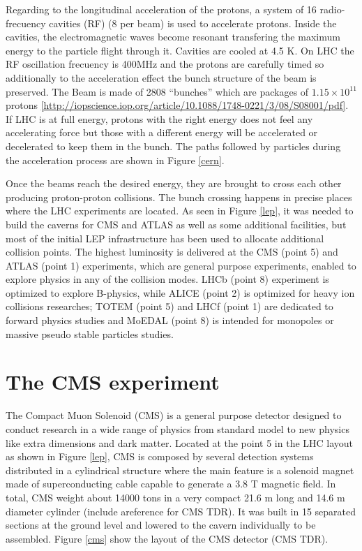 \noindent Regarding to the longitudinal acceleration of the protons, a system of 16 radio-frecuency cavities (RF) (8 per beam) is used to accelerate protons. Inside the cavities, the electromagnetic waves become resonant transfering the maximum energy to the particle flight through it. Cavities are cooled at 4.5 K. On LHC the RF oscillation frecuency is 400MHz and the protons are carefully timed so additionally to the acceleration effect the bunch structure of the beam is preserved. The Beam is made of 2808 ``bunches'' which are packages of $1.15 \times 10^11$ protons \ref{http://iopscience.iop.org/article/10.1088/1748-0221/3/08/S08001/pdf}. If LHC is at full energy, protons with the right energy does not feel any accelerating force but those with a different energy will be accelerated or decelerated to keep them in the bunch. The paths followed by particles during the acceleration process are shown in Figure \ref{cern}.




Once the beams reach the desired energy, they are brought to cross each other producing proton-proton collisions. The bunch crossing happens in precise places where the LHC experiments are located. As seen in Figure \ref{lep}, it was needed to build the caverns for CMS and ATLAS as well as some additional facilities, but most of the initial LEP infrastructure has been used to allocate additional collision points. The highest luminosity is delivered at the CMS (point 5) and ATLAS (point 1) experiments, which are general purpose experiments, enabled to explore physics in any of the collision modes. LHCb (point 8) experiment is optimized to explore B-physics, while ALICE (point 2) is optimized for heavy ion collisions researches; TOTEM (point 5) and LHCf (point 1) are dedicated to forward physics studies and MoEDAL (point 8) is intended for monopoles or massive pseudo stable particles studies.


\section{The CMS experiment}

The Compact Muon Solenoid (CMS) is a general purpose detector designed to conduct research in a wide range of physics from standard model to new physics like extra dimensions and dark matter. Located at the point 5 in the LHC layout as shown in Figure \ref{lep}, CMS is composed by several detection systems distributed in a cylindrical structure where the main feature is a solenoid magnet made of superconducting cable capable to generate a 3.8 T magnetic field. In total, CMS weight about 14000 tons in a very compact 21.6 m long and 14.6 m diameter cylinder (include areference for CMS TDR). It was built in 15 separated sections at the ground level and lowered to the cavern individually to be assembled. Figure \ref{cms} show the layout of the CMS detector (CMS TDR).          

